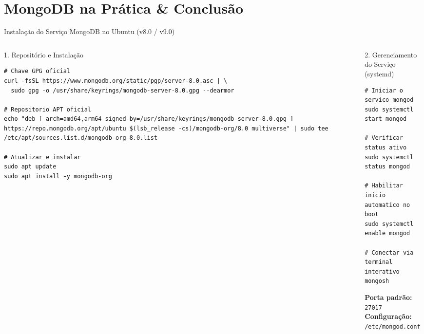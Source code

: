 \section{MongoDB na Prática \& Conclusão}

\begin{frame}[fragile]{Instalação do Serviço MongoDB no Ubuntu (v8.0 / v9.0)}
  \vspace{-0.2cm}
  \begin{columns}[t]
    \begin{column}{0.50\textwidth}
      \alert{1. Repositório e Instalação}\par
      \begin{lstlisting}[basicstyle=\ttfamily\tiny]
# Chave GPG oficial
curl -fsSL https://www.mongodb.org/static/pgp/server-8.0.asc | \
  sudo gpg -o /usr/share/keyrings/mongodb-server-8.0.gpg --dearmor

# Repositorio APT oficial
echo "deb [ arch=amd64,arm64 signed-by=/usr/share/keyrings/mongodb-server-8.0.gpg ] https://repo.mongodb.org/apt/ubuntu $(lsb_release -cs)/mongodb-org/8.0 multiverse" | sudo tee /etc/apt/sources.list.d/mongodb-org-8.0.list

# Atualizar e instalar
sudo apt update
sudo apt install -y mongodb-org
      \end{lstlisting}
    \end{column}

    \begin{column}{0.48\textwidth}
      \alert{2. Gerenciamento do Serviço (systemd)}\par
      \begin{lstlisting}[basicstyle=\ttfamily\tiny]
# Iniciar o servico mongod
sudo systemctl start mongod

# Verificar status ativo
sudo systemctl status mongod

# Habilitar inicio automatico no boot
sudo systemctl enable mongod

# Conectar via terminal interativo
mongosh
      \end{lstlisting}
      \vspace{0.1cm}
      \scriptsize \textbf{Porta padrão:} \texttt{27017}\\
      \textbf{Configuração:} \texttt{/etc/mongod.conf}
    \end{column}
  \end{columns}
\end{frame}

